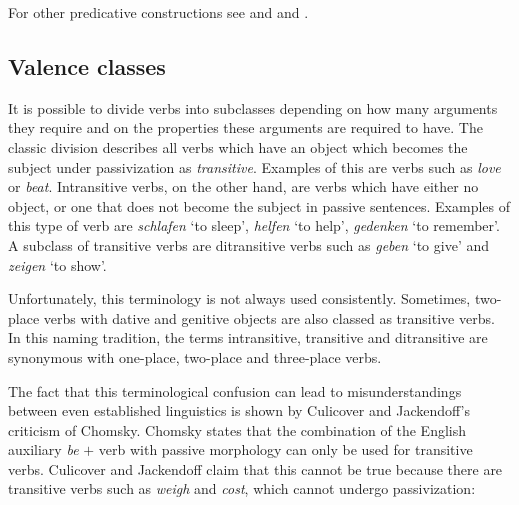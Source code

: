 For other predicative constructions see  and 
and .


\subsection{Valence classes}

\addlines
It is possible to divide verbs into subclasses depending on how many arguments they require and on the properties these arguments are required to have. The
classic division describes all verbs which have an object which becomes the subject under passivization as \emph{transitive}. Examples of this
are verbs such as \emph{love} or \emph{beat}. Intransitive verbs, on the other hand, are verbs which have either no object, or one that does not become the subject in passive
sentences. Examples of this type of verb are \emph{schlafen} `to sleep', \emph{helfen} `to help', \emph{gedenken} `to remember'. A subclass of transitive verbs are 
ditransitive verbs such as \emph{geben} `to give' and \emph{zeigen} `to show'.

Unfortunately, this terminology is not always used consistently. Sometimes, two-place verbs with
dative and genitive objects are also classed as transitive verbs. In this naming tradition, the
terms intransitive, transitive and ditransitive are synonymous with one-place, two-place and
three-place verbs.

The fact that this terminological confusion can lead to misunderstandings between even established linguistics is shown by Culicover and Jackendoff's \citeyearpar[]{CJ2005a} criticism 
of Chomsky. Chomsky states that the combination of the English auxiliary \emph{be} $+$ verb with passive morphology can only be used for transitive verbs. Culicover and Jackendoff claim that this cannot
be true because there are transitive verbs such as \emph{weigh} and \emph{cost}, which cannot undergo passivization:
\eal
{}
\zl

